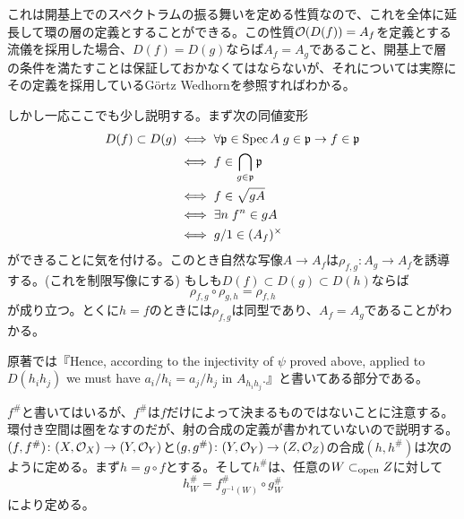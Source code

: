 \begin{rem}
  これは開基上でのスペクトラムの振る舞いを定める性質なので、これを全体に延長して環の層の定義とすることができる。この性質$\mathcal{O}(D(f)) = A_f$を定義とする流儀を採用した場合、$D(f)=D(g)$ならば$A_f = A_g$であること、開基上で層の条件を満たすことは保証しておかなくてはならないが、それについては実際にその定義を採用しているG\"{o}rtz Wedhorn\cite{GW}を参照すればわかる。

  しかし一応ここでも少し説明する。まず次の同値変形
  \begin{align*}
    D(f) \subset D(g) &\iff \forall \mathfrak{p} \in \operatorname{Spec} A \; g \in \mathfrak{p} \to f \in \mathfrak{p} \\
    &\iff f \in \bigcap_{g \in \mathfrak{p}} \mathfrak{p} \\
    &\iff f \in \sqrt{gA} \\
    &\iff \exists n \; f^n \in gA \\
    &\iff g/1 \in (A_f)^{\times}
  \end{align*}
  ができることに気を付ける。このとき自然な写像$A \to A_f$は$\rho_{f,g} \colon A_g \to A_f$を誘導する。(これを制限写像にする) もしも$D(f) \subset D(g) \subset D(h)$ならば
  \[
  \rho_{f,g} \circ \rho_{g,h} = \rho_{f,h}
  \]
  が成り立つ。とくに$h=f$のときには$\rho_{f,g}$は同型であり、$A_f = A_g$であることがわかる。
\end{rem}


\begin{rem}
  原著では『Hence, according to the injectivity of $\psi$ proved above, applied to $D(h_ih_j)$ we must have $a_i / h_i = a_j / h_j$ in $A_{h_i h_j}$.』と書いてある部分である。
\end{rem}



\begin{rem}
  $f^{\#}$と書いてはいるが、$f^{\#}$は$f$だけによって決まるものではないことに注意する。環付き空間は圏をなすのだが、射の合成の定義が書かれていないので説明する。$(f,f^{\#}) \colon (X,\mathcal{O}_X) \to (Y,\mathcal{O}_Y)$と$(g,g^{\#}) \colon (Y,\mathcal{O}_Y) \to (Z,\mathcal{O}_Z)$の合成$(h,h^{\#})$は次のように定める。まず$h = g \circ f$とする。そして$h^{\#}$は、任意の$W \subset_{\text{open}} Z$に対して
  \[
  h^{\#}_W = f^{\#}_{g^{-1}(W)} \circ g^{\#}_W
  \]
  により定める。
\end{rem}

